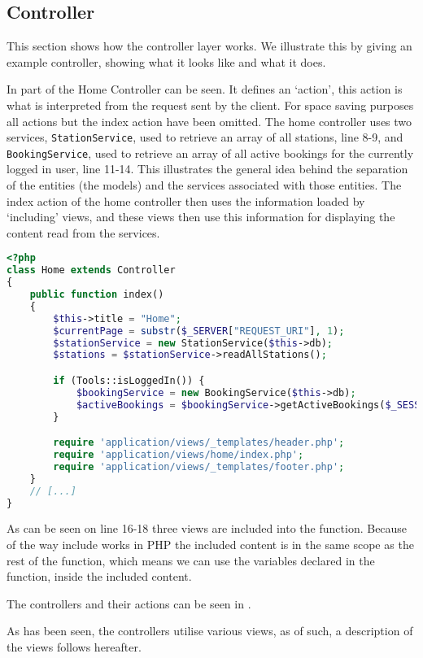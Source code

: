 \subsection{Controller}
This section shows how the controller layer works. 
We illustrate this by giving an example controller, showing what it looks like and what it does.

In  part of the Home Controller can be seen. 
It defines an `action', this action is what is interpreted from the request sent by the client. 
For space saving purposes all actions but the index action have been omitted.
The home controller uses two services, \texttt{StationService}, used to retrieve an array of all stations, line 8-9, and \texttt{BookingService}, used to retrieve an array of all active bookings for the currently logged in user, line 11-14. 
This illustrates the general idea behind the separation of the entities (the models) and the services associated with those entities.
The index action of the home controller then uses the information loaded by `including' views, and these views then use this information for displaying the content read from the services.

\begin{lstlisting}[language=php, label=lst:homeController, caption={Home Controller Class}]
<?php
class Home extends Controller
{
    public function index()
    {
        $this->title = "Home";
        $currentPage = substr($_SERVER["REQUEST_URI"], 1);
        $stationService = new StationService($this->db);
        $stations = $stationService->readAllStations();

        if (Tools::isLoggedIn()) {
            $bookingService = new BookingService($this->db);
            $activeBookings = $bookingService->getActiveBookings($_SESSION["login_user"]);
        }

        require 'application/views/_templates/header.php';
        require 'application/views/home/index.php';
        require 'application/views/_templates/footer.php';
    }
    // [...]
}
\end{lstlisting}

As can be seen on line 16-18 three views are included into the function. Because of the way include works in PHP the included content is in the same scope as the rest of the function, which means we can use the variables declared in the function, inside the included content.

The controllers and their actions can be seen in .

As has been seen, the controllers utilise various views, as of such, a description of the views follows hereafter.